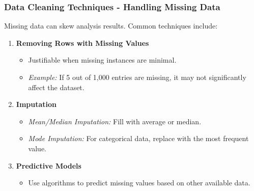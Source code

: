 \documentclass[aspectratio=169]{beamer}
\begin{document}
\begin{frame}[fragile]
    \frametitle{Data Cleaning Techniques - Handling Missing Data}
    Missing data can skew analysis results. Common techniques include:
    \begin{enumerate}
        \item \textbf{Removing Rows with Missing Values}
            \begin{itemize}
                \item Justifiable when missing instances are minimal.
                \item \textit{Example:} If 5 out of 1,000 entries are missing, it may not significantly affect the dataset.
            \end{itemize}
        \item \textbf{Imputation}
            \begin{itemize}
                \item \textit{Mean/Median Imputation:} Fill with average or median.
                \item \textit{Mode Imputation:} For categorical data, replace with the most frequent value.
            \end{itemize}
        \item \textbf{Predictive Models}
            \begin{itemize}
                \item Use algorithms to predict missing values based on other available data.
            \end{itemize}
    \end{enumerate}
\end{frame}
\end{document}
